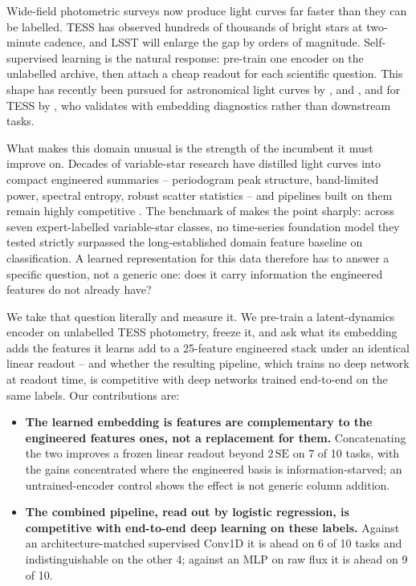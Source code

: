 \documentclass{article}
\providecommand{\DIFaddtex}[1]{{\protect\color{blue} \sf #1}} %
\providecommand{\DIFdeltex}[1]{{\protect\color{red} \scriptsize #1}} %
\providecommand{\DIFaddbegin}{} %
\providecommand{\DIFaddend}{} %
\providecommand{\DIFdelbegin}{} %
\providecommand{\DIFdelend}{} %
\providecommand{\DIFadd}[1]{\texorpdfstring{\DIFaddtex{#1}}{#1}} %
\providecommand{\DIFdel}[1]{\texorpdfstring{\DIFdeltex{#1}}{}} %
\providecommand{\DIFscaledelfig}{0.5}
\newlength{\DIFdelgraphicswidth} %
\newlength{\DIFdelgraphicsheight} %
\providecommand{\DIFaddincludegraphics}[2][]{{\color{blue}\fbox{\DIFOincludegraphics[#1]{#2}}}} %
\providecommand{\DIFdelincludegraphics}[2][]{%
\sbox{\DIFdelgraphicsbox}{\DIFOincludegraphics[#1]{#2}}%
\settoboxwidth{\DIFdelgraphicswidth}{\DIFdelgraphicsbox} %
\settoboxtotalheight{\DIFdelgraphicsheight}{\DIFdelgraphicsbox} %
\scalebox{\DIFscaledelfig}{%
\parbox[b]{\DIFdelgraphicswidth}{\usebox{\DIFdelgraphicsbox}\\[-\baselineskip] \rule{\DIFdelgraphicswidth}{0em}}\llap{\resizebox{\DIFdelgraphicswidth}{\DIFdelgraphicsheight}{%
\setlength{\unitlength}{\DIFdelgraphicswidth}%
\begin{picture}(1,1)%
\thicklines\linethickness{2pt} %
{\color[rgb]{1,0,0}\put(0,0){\framebox(1,1){}}}%
{\color[rgb]{1,0,0}\put(0,0){\line( 1,1){1}}}%
{\color[rgb]{1,0,0}\put(0,1){\line(1,-1){1}}}%
\end{picture}%
}\hspace*{3pt}}} %
} %
\DeclareRobustCommand{\DIFaddbegin}{\DIFOaddbegin \let\includegraphics\DIFaddincludegraphics} %
\DeclareRobustCommand{\DIFaddend}{\DIFOaddend \let\includegraphics\DIFOincludegraphics} %
\DeclareRobustCommand{\DIFdelbegin}{\DIFOdelbegin \let\includegraphics\DIFdelincludegraphics} %
\DeclareRobustCommand{\DIFdelend}{\DIFOaddend \let\includegraphics\DIFOincludegraphics} %
\begin{document}
Wide-field photometric surveys now produce light curves far faster than they can be labelled. TESS
\citep{ricker2015} has observed hundreds of thousands of bright stars at two-minute cadence, and
LSST \citep{ivezic2019} will enlarge the gap by orders of magnitude. Self-supervised learning is the
natural response: pre-train one encoder on the unlabelled archive, then attach a cheap readout for
each scientific question. This shape has recently been pursued for astronomical light curves by
\citet{donoso2025astromer2}, \citet{zuo2025falco} and \citet{rui2026jepa}, and for TESS by
\citet{poznanski2026}, who validates with embedding diagnostics rather than downstream tasks.

What makes this domain unusual is the strength of the incumbent it must improve on. Decades of variable-star
research have distilled light curves into compact engineered summaries -- periodogram peak structure,
band-limited power, spectral entropy, robust scatter statistics -- and pipelines built on them remain
highly competitive \citep{audenaert2021}. The benchmark of \citet{li2025staremb} makes the point
sharply: across seven expert-labelled variable-star classes, no time-series foundation model they
tested strictly surpassed the long-established domain feature baseline on classification. A learned
representation for this data therefore has to answer a specific question, not a generic one: does it
carry information the engineered features do not already have?

We take that question literally and measure it. We pre-train a latent-dynamics encoder on unlabelled
TESS photometry, freeze it, and ask what \DIFdelbegin \DIFdel{its embedding adds }\DIFdelend \DIFaddbegin \DIFadd{the features it learns add }\DIFaddend to a 25-feature engineered stack under an
identical linear readout -- and whether the resulting pipeline, which trains no deep network at
readout time, is competitive with deep networks trained end-to-end on the same labels. Our
contributions are:

\begin{itemize}
\item \textbf{The learned \DIFdelbegin \DIFdel{embedding is }\DIFdelend \DIFaddbegin \DIFadd{features are }\DIFaddend complementary to \DIFaddbegin \DIFadd{the }\DIFaddend engineered \DIFdelbegin \DIFdel{features}\DIFdelend \DIFaddbegin \DIFadd{ones}\DIFaddend , not a replacement for
them.} Concatenating the two improves a frozen linear readout beyond $2\,\mathrm{SE}$ on 7 of 10
tasks, with the gains concentrated where the engineered basis is information-starved; an
untrained-encoder control shows the effect is not generic column addition.
\item \textbf{The combined pipeline, read out by logistic regression, is competitive with end-to-end
deep learning on these labels.} Against an architecture-matched supervised Conv1D it is ahead on 6
of 10 tasks and indistinguishable on the other 4; against an MLP on raw flux it is ahead on 9 of 10.
\end{itemize}
\end{document}

